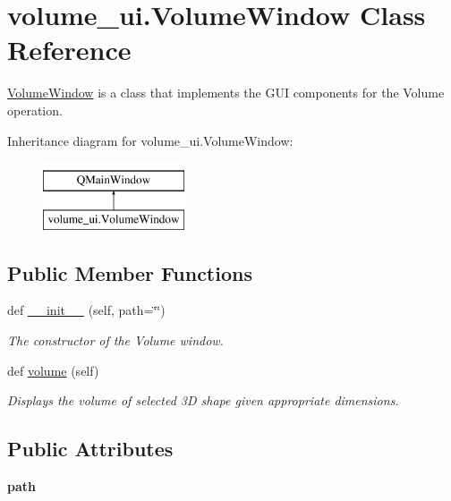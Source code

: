 \hypertarget{classvolume__ui_1_1_volume_window}{}\section{volume\+\_\+ui.\+Volume\+Window Class Reference}
\label{classvolume__ui_1_1_volume_window}


\hyperlink{classvolume__ui_1_1_volume_window}{Volume\+Window} is a class that implements the G\+UI components for the Volume operation.  


Inheritance diagram for volume\+\_\+ui.\+Volume\+Window\+:\begin{figure}[H]
\begin{center}
\leavevmode
\includegraphics[height=2.000000cm]{classvolume__ui_1_1_volume_window}
\end{center}
\end{figure}
\subsection*{Public Member Functions}
\begin{DoxyCompactItemize}
\item 
def \hyperlink{classvolume__ui_1_1_volume_window_ab2ab926742b93b5fc0030332e60d4bc7}{\+\_\+\+\_\+init\+\_\+\+\_\+} (self, path=\char`\"{}\char`\"{})
\begin{DoxyCompactList}\small\item\em The constructor of the Volume window. \end{DoxyCompactList}\item 
def \hyperlink{classvolume__ui_1_1_volume_window_a1b4cb7b0bd52c5898a39dbfb81e5cb85}{volume} (self)
\begin{DoxyCompactList}\small\item\em Displays the volume of selected 3D shape given appropriate dimensions. \end{DoxyCompactList}\end{DoxyCompactItemize}
\subsection*{Public Attributes}
\begin{DoxyCompactItemize}
\item 
\mbox{\label{classvolume__ui_1_1_volume_window_ac1968ad0245de90cc4efb39c682d77b1}} 
{\bfseries path}
\end{DoxyCompactItemize}


